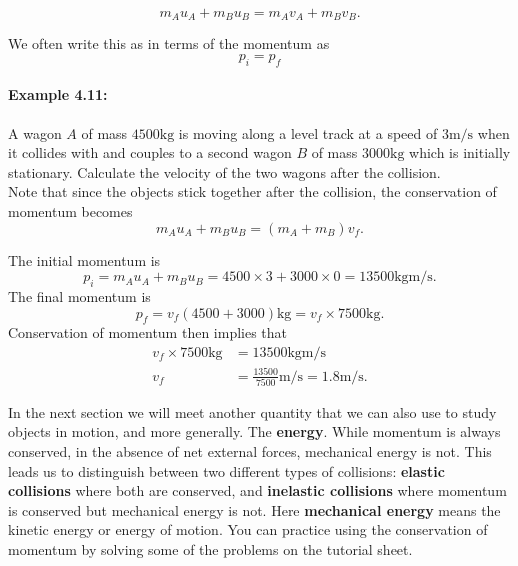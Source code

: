 \documentclass[a4paper,12pt]{book}
\begin{document}
\begin{equation*}
m_{A}u_{A}+m_{B}u_{B}=m_{A}v_{A}+m_{B}v_{B}.
\end{equation*}

We often write this as in terms of the momentum as
\begin{equation}
p_{i}=p_{f}
\label{eq: conservation of momentum}
\end{equation}

\paragraph{Example 4.11:} A wagon $A$ of mass $4500\text{kg}$ is moving along a level track at a speed of $3\text{m/s}$ when it collides with and couples to a second wagon $B$ of mass $3000\text{kg}$ which is initially stationary. Calculate the velocity of the two wagons after the collision.\\

Note that since the objects stick together after the collision, the conservation of momentum becomes
\begin{equation*}
m_{A}u_{A}+m_{B}u_{B}=(m_{A}+m_{B})v_{f}.
\end{equation*}

The initial momentum is
\begin{equation*}
p_{i}=m_{A}u_{A}+m_{B}u_{B}=4500\times 3+3000\times 0=13500\text{kgm/s}.
\end{equation*}
The final momentum is
\begin{equation*}
p_{f}=v_{f}(4500+3000) \text{kg} =v_{f}\times 7500\text{kg}.
\end{equation*}
Conservation of momentum then implies that
\begin{align*}
v_{f}\times 7500\text{kg}&=13500\text{kgm/s}\\
v_{f}&=\frac{13500}{7500}\text{m/s}=1.8\text{m/s}.
\end{align*}

In the next section we will meet another quantity that we can also use to study objects in motion, and more generally. The \textbf{energy}.  While momentum is always conserved, in the absence of net external forces, mechanical energy is not. This leads us to distinguish between two different types of collisions: \textbf{elastic collisions} where both are conserved, and \textbf{inelastic collisions} where momentum is conserved but mechanical energy is not. Here \textbf{mechanical energy} means the kinetic energy or energy of motion. You can practice using the conservation of momentum by solving some of the problems on the tutorial sheet.
\end{document}
